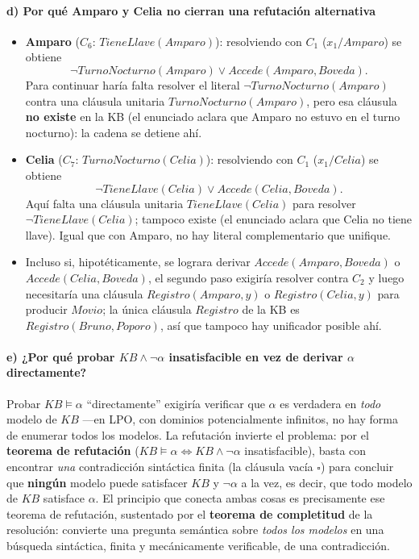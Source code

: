 \paragraph{d) Por qué Amparo y Celia no cierran una refutación alternativa}
\begin{itemize}
    \item \textbf{Amparo} ($C_6$: $TieneLlave(Amparo)$): resolviendo con $C_1$ ($x_1/Amparo$) se
    obtiene
    \[
        \neg TurnoNocturno(Amparo)\lor Accede(Amparo,Boveda).
    \]
    Para continuar haría falta resolver el literal $\neg TurnoNocturno(Amparo)$ contra una cláusula
    unitaria $TurnoNocturno(Amparo)$, pero esa cláusula \textbf{no existe} en la KB (el enunciado
    aclara que Amparo no estuvo en el turno nocturno): la cadena se detiene ahí.

    \item \textbf{Celia} ($C_7$: $TurnoNocturno(Celia)$): resolviendo con $C_1$ ($x_1/Celia$) se
    obtiene
    \[
        \neg TieneLlave(Celia)\lor Accede(Celia,Boveda).
    \]
    Aquí falta una cláusula unitaria $TieneLlave(Celia)$ para resolver $\neg TieneLlave(Celia)$;
    tampoco existe (el enunciado aclara que Celia no tiene llave). Igual que con Amparo, no hay
    literal complementario que unifique.

    \item Incluso si, hipotéticamente, se lograra derivar $Accede(Amparo,Boveda)$ o
    $Accede(Celia,Boveda)$, el segundo paso exigiría resolver contra $C_2$ y luego necesitaría una
    cláusula $Registro(Amparo,y)$ o $Registro(Celia,y)$ para producir $Movio$; la única cláusula
    $Registro$ de la KB es $Registro(Bruno,Poporo)$, así que tampoco hay unificador posible ahí.
\end{itemize}

\paragraph{e) ¿Por qué probar $KB\land\neg\alpha$ insatisfacible en vez de derivar $\alpha$
directamente?}
Probar $KB\models\alpha$ ``directamente'' exigiría verificar que $\alpha$ es verdadera en \emph{todo}
modelo de $KB$ —en LPO, con dominios potencialmente infinitos, no hay forma de enumerar todos los
modelos. La refutación invierte el problema: por el \textbf{teorema de refutación}
($KB\models\alpha \Leftrightarrow KB\land\neg\alpha$ insatisfacible), basta con encontrar \emph{una}
contradicción sintáctica finita (la cláusula vacía $\square$) para concluir que \textbf{ningún}
modelo puede satisfacer $KB$ y $\neg\alpha$ a la vez, es decir, que todo modelo de $KB$ satisface
$\alpha$. El principio que conecta ambas cosas es precisamente ese teorema de refutación, sustentado
por el \textbf{teorema de completitud} de la resolución: convierte una pregunta semántica sobre
\emph{todos los modelos} en una búsqueda sintáctica, finita y mecánicamente verificable, de una
contradicción.
